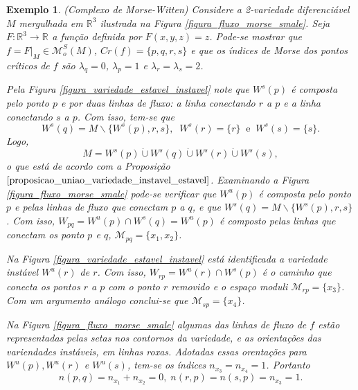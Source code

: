 \documentclass[12pt]{book}
\newtheorem{exemplo}[teorema]{Exemplo}
\newcommand{\complementar}[2]{#1 \backslash #2}
\newcommand{\espacomoduli}[2]{\mathcal{M}_{#1#2}}
\newcommand{\funcoesmorsesmale}[1]{\mathcal{M}^{S}_{o}(#1)}
\newcommand{\pontoscriticos}[1]{\textit{Cr}(#1)}
\newcommand{\real}[1]{\mathbb{R}^{#1}}
\newcommand{\reta}{\real{}}
\newcommand{\variedadeconectantepontos}[2]{W_{#1#2}}
\newcommand{\variedadeestavel}[1]{W^{s}(#1)}
\newcommand{\variedadeinstavel}[1]{W^{u}(#1)}
\begin{document}
	\begin{exemplo}
		(Complexo de Morse-Witten) Considere a 2-variedade diferenciável $M$ mergulhada em $\real{3}$ ilustrada na Figura \ref{figura_fluxo_morse_smale}. Seja $F:\real{3} \to \reta$ a função definida por $F(x, y, z) = z$. Pode-se mostrar que $f=F|_{M} \in \funcoesmorsesmale{M}$,  $\pontoscriticos{f} = \{p,q,r,s\}$ e que os índices de Morse dos pontos críticos de $f$ são $\lambda_{q} = 0$, $\lambda_{p} = 1$ e $\lambda_{r}=\lambda_{s} = 2$. 
		
		Pela Figura \ref{figura_variedade_estavel_instavel} note  que $\variedadeestavel{p}$ é composta pelo ponto $p$  e por duas linhas de fluxo: a linha conectando $r$ a $p$ e a linha conectando $s$ a $p$. Com isso, tem-se que 
		$$
		\variedadeestavel{q} = \complementar{M}{\{\variedadeestavel{p}, r, s\}},\;\; \variedadeestavel{r} =\{r\}\;\;\text{e}\;\; \variedadeestavel{s} = \{s\}.
		$$
		Logo, 
		$$
		M = \variedadeestavel{p}\dot{\cup} \variedadeestavel{q}\dot{\cup} \variedadeestavel{r}\dot{\cup} \variedadeestavel{s},
		$$
		o que está de acordo com a Proposição $\ref{proposicao_uniao_variedade_instavel_estavel}$. Examinando a Figura \ref{figura_fluxo_morse_smale} pode-se verificar que $\variedadeinstavel{p}$ é composta pelo ponto $p$ e pelas linhas de fluxo que conectam $p$ a $q$, e que $\variedadeestavel{q} = \complementar{M}{\{\variedadeestavel{p},r,s\}}$. Com isso, $\variedadeconectantepontos{p}{q} = \variedadeinstavel{p}\cap\variedadeestavel{q} = \variedadeinstavel{p}$ é composto pelas linhas que conectam os ponto $p$ e $q$,  $\espacomoduli{p}{q}=\{x_{1}, x_{2}\}$. 
		
		Na Figura \ref{figura_variedade_estavel_instavel} está identificada a variedade instável $\variedadeinstavel{r}$ de $r$. Com isso, $\variedadeconectantepontos{r}{p} = \variedadeinstavel{r} \cap\variedadeestavel{p}$ é o caminho que conecta os pontos $r$ a $p$ com o ponto $r$ removido e o espaço moduli $\espacomoduli{r}{p} = \{ x_{3}\}$. Com um argumento análogo conclui-se que $\espacomoduli{s}{p} = \{x_{4} \}$.
		
		Na Figura \ref{figura_fluxo_morse_smale} algumas das linhas de fluxo de $f$ estão representadas pelas setas nos contornos da variedade, e as orientações das variendades instáveis, em linhas roxas. Adotadas essas orentações para $\variedadeinstavel{p},\variedadeinstavel{r}$ e $\variedadeinstavel{s}$, tem-se os índices $n_{x_{3}} =n_{x_{4}}= 1$. Portanto 
		$$
		n(p,q) = n_{x_{1}}+n_{x_{2}} = 0,\; n(r,p) = n(s,p)=n_{x_{3}}= 1. 
		$$
		

\end{exemplo}
\end{document}
